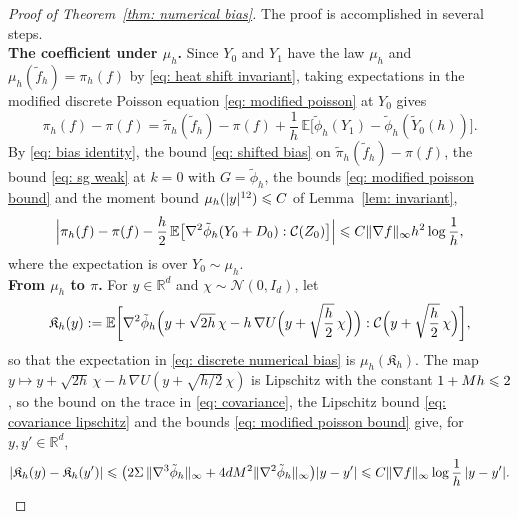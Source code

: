 \begin{proof}[Proof of Theorem~\ref{thm: numerical bias}]
    The proof is accomplished in several steps.\\[6pt]
    \textbf{The coefficient under $\mu_h$.} Since $Y_0$ and $Y_1$ have the law $\mu_h$ and $\mu_h(\tilde f_h) = \pi_h(f)$ by \eqref{eq: heat shift invariant}, taking expectations in the modified discrete Poisson equation \eqref{eq: modified poisson} at $Y_0$ gives
    \begin{equation}
        \pi_h(f) - \pi(f) = \tilde\pi_h(\tilde f_h) - \pi(f) + \frac1h\, \mathbb E\bigl[ \tilde\phi_h(Y_1) - \tilde\phi_h(\tilde Y_0(h)) \bigr] .
        \label{eq: bias identity}
    \end{equation}
    By \eqref{eq: bias identity}, the bound \eqref{eq: shifted bias} on $\tilde\pi_h(\tilde f_h) - \pi(f)$, the bound \eqref{eq: sg weak} at $k = 0$ with $G = \tilde\phi_h$, the bounds \eqref{eq: modified poisson bound} and the moment bound $\mu_h(|y|^{12}) \leqslant C$ of Lemma~\ref{lem: invariant},
    \begin{equation}
        \Bigl| \pi_h(f) - \pi(f) - \frac h2\, \mathbb E\bigl[ \nabla^2 \tilde\phi_h(Y_0 + D_0) : \mathcal C(Z_0) \bigr] \Bigr| \leqslant C \lVert \nabla f \rVert_\infty h^2 \log\frac1h ,
        \label{eq: discrete numerical bias}
    \end{equation}
    where the expectation is over $Y_0 \sim \mu_h$.\\[6pt]
    \textbf{From $\mu_h$ to $\pi$.} For $y \in \mathbb R^d$ and $\chi \sim \mathcal N(0, I_d)$, let
    \begin{equation}
        \mathfrak K_h(y) := \mathbb E\biggl[ \nabla^2 \tilde\phi_h\Bigl( y + \sqrt{2h}\, \chi - h\, \nabla U\Bigl( y + \sqrt{\frac h2}\, \chi \Bigr) \Bigr) : \mathcal C\Bigl( y + \sqrt{\frac h2}\, \chi \Bigr) \biggr] ,
        \label{eq: coefficient integrand}
    \end{equation}
    so that the expectation in \eqref{eq: discrete numerical bias} is $\mu_h(\mathfrak K_h)$. The map $y \mapsto y + \sqrt{2h}\, \chi - h\, \nabla U( y + \sqrt{h/2}\, \chi )$ is Lipschitz with the constant $1 + M h \leqslant 2$, so the bound on the trace in \eqref{eq: covariance}, the Lipschitz bound \eqref{eq: covariance lipschitz} and the bounds \eqref{eq: modified poisson bound} give, for $y, y' \in \mathbb R^d$,
    \begin{equation*}
        |\mathfrak K_h(y) - \mathfrak K_h(y')| \Le \bigl( 2 \Sigma\, \norm{\nabla^3 \tilde\phi_h}_\infty + 4 d M^2 \norm{\nabla^2 \tilde\phi_h}_\infty \bigr) |y - y'| \Le C \norm{\nabla f}_\infty \log\frac1h\, |y - y'| .

\end{equation*}
\end{proof}
